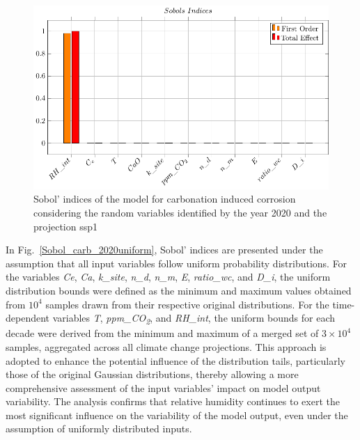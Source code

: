 \begin{figure}[H]
    \centering
    \includegraphics[width=\linewidth]{imgs/pdfs/sobols_indices/carbonation/17_sobols_2020_ssp1.pdf}
    \caption{Sobol' indices of the model for carbonation induced corrosion considering the random variables identified by the year 2020 and the projection ssp1}\label{Sobol_carb_2020ssp1}
\end{figure}
In Fig.~\ref{Sobol_carb_2020uniform}, Sobol' indices are presented under the assumption that all input variables follow uniform probability distributions. For the variables \textit{Ce}, \textit{Ca}, \textit{k\_site}, \textit{n\_d}, \textit{n\_m}, \textit{E}, \textit{ratio\_wc}, and \textit{D\_i}, the uniform distribution bounds were defined as the minimum and maximum values obtained from $10^4$ samples drawn from their respective original distributions. For the time-dependent variables \textit{T}, \textit{ppm\_CO\textsubscript{2}}, and \textit{RH\_int}, the uniform bounds for each decade were derived from the minimum and maximum of a merged set of $3 \times 10^4$ samples, aggregated across all climate change projections. This approach is adopted to enhance the potential influence of the distribution tails, particularly those of the original Gaussian distributions, thereby allowing a more comprehensive assessment of the input variables' impact on model output variability. 
The analysis confirms that relative humidity continues to exert the most significant influence on the variability of the model output, even under the assumption of uniformly distributed inputs.
